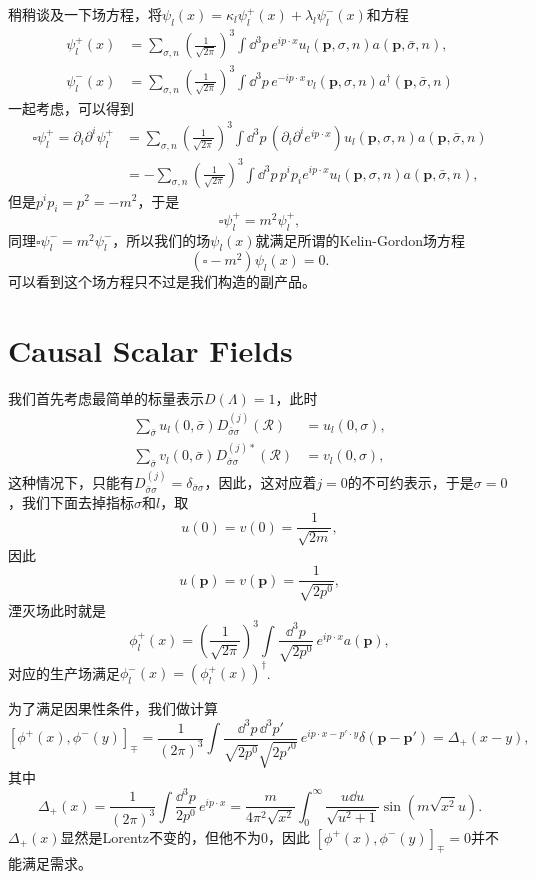 \documentclass[10pt]{extbook}
\theoremstyle{plain}%
\begin{document}
稍稍谈及一下场方程，将$\psi_l(x)=\kappa_l\psi_l^+(x)+\lambda_l\psi_l^-(x)$和方程
\[
\begin{split}
	\psi_l^{+}(x)&=\sum_{\sigma,n}\left(\frac{1}{\sqrt{2\pi}}\right)^{3}\int \dd^3 p\, e^{ip\cdot x}u_{l}(\mathbf{p},\sigma,n)a(\mathbf{p},\bar{\sigma},n),\\
	\psi_l^{-}(x)&=\sum_{\sigma,n}\left(\frac{1}{\sqrt{2\pi}}\right)^{3}\int \dd^3 p\, e^{-ip\cdot x}v_{l}(\mathbf{p},\sigma,n)a^\dag(\mathbf{p},\bar{\sigma},n)
\end{split}
\]
一起考虑，可以得到
\[
\begin{split}
\square\psi_l^{+}=\partial_i\partial^i\psi_l^{+}&=\sum_{\sigma,n}\left(\frac{1}{\sqrt{2\pi}}\right)^{3}\int \dd^3 p\,(\partial_i\partial^i e^{ip\cdot x})u_{l}(\mathbf{p},\sigma,n)a(\mathbf{p},\bar{\sigma},n)\\
&=-\sum_{\sigma,n}\left(\frac{1}{\sqrt{2\pi}}\right)^{3}\int \dd^3 p\,p^ip_i e^{ip\cdot x}u_{l}(\mathbf{p},\sigma,n)a(\mathbf{p},\bar{\sigma},n),
\end{split}
\]
但是$p^ip_i=p^2=-m^2$，于是
\[
\square\psi_l^{+}=m^2\psi_l^{+},
\]
同理$\square\psi_l^{-}=m^2\psi_l^{-}$，所以我们的场$\psi_l(x)$就满足所谓的Kelin-Gordon场方程
\[
	(\square-m^2)\psi_l(x)=0.
\]
可以看到这个场方程只不过是我们构造的副产品。

\section{Causal Scalar Fields}
我们首先考虑最简单的标量表示$D(\Lambda)=1$，此时
\[
	\begin{split}
		\sum_{\bar{\sigma}}u_{l}(0,\bar{\sigma})D^{(j)}_{\bar{\sigma}\sigma}\left(\mathscr{R}\right)&=u_{l}(0,\sigma),\\
		\sum_{\bar{\sigma}}v_{l}(0,\bar{\sigma})D^{(j)*}_{\bar{\sigma}\sigma}\left(\mathscr{R}\right)&=v_{l}(0,\sigma),
	\end{split}
\]
这种情况下，只能有$D^{(j)}_{\bar{\sigma}\sigma}=\delta_{\bar{\sigma}\sigma}$，因此，这对应着$j=0$的不可约表示，于是$\sigma=0$，我们下面去掉指标$\sigma$和$l$，取
\[
	u(0)=v(0)=\frac{1}{\sqrt{2m}},
\]
因此
\[
	u(\mathbf{p})=v(\mathbf{p})=\frac{1}{\sqrt{2p^0}},
\]
湮灭场此时就是
\[
	\phi_l^{+}(x)=\left(\frac{1}{\sqrt{2\pi}}\right)^{3}\int \frac{\dd^3 p}{\sqrt{2p^0}}\, e^{ip\cdot x}a(\mathbf{p}),
\]
对应的生产场满足$\phi_l^{-}(x)=(\phi_l^{+}(x))^\dag$.

为了满足因果性条件，我们做计算
\[
	[\phi^{+}(x),\phi^{-}(y)]_{\mp}=\frac{1}{(2\pi)^{3}}\int\frac{\dd^3 p\,\dd^3 p'}{\sqrt{2p^0}\sqrt{2p'^0}}\,e^{ip\cdot x-p'\cdot y}\delta(\mathbf{p}-\mathbf{p'})=\Delta_+(x-y),
\]
其中
\[
\Delta_+(x)=\frac{1}{(2\pi)^{3}}\int\frac{\dd^3 p}{2p^0}\,e^{ip\cdot x}=\frac{m}{4\pi^2\sqrt{x^2}}\int_0^\infty\frac{u\dd u}{\sqrt{u^2+1}}\sin (m\sqrt{x^2} u).
\]
$\Delta_+(x)$显然是Lorentz不变的，但他不为0，因此
$[\phi^{+}(x),\phi^{-}(y)]_{\mp}=0$并不能满足需求。
\end{document}
